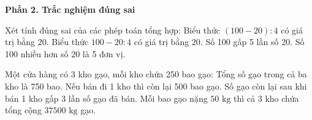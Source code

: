 \textbf{Phần 2. Trắc nghiệm đúng sai}

\begin{ex} %
Xét tính đúng sai của các phép toán tổng hợp:
\choiceTF
{\True Biểu thức $(100 - 20) : 4$ có giá trị bằng $20$.}
{Biểu thức $100 - 20 : 4$ có giá trị bằng $20$.}
{\True Số 100 gấp 5 lần số 20.}
{Số 100 nhiều hơn số 20 là 5 đơn vị.}
\end{ex}

\begin{ex} %
Một cửa hàng có 3 kho gạo, mỗi kho chứa 250 bao gạo:
\choiceTF
{\True Tổng số gạo trong cả ba kho là 750 bao.}
{\True Nếu bán đi 1 kho thì còn lại 500 bao gạo.}
{Số gạo còn lại sau khi bán 1 kho gấp 3 lần số gạo đã bán.}
{\True Mỗi bao gạo nặng $50\text{ kg}$ thì cả 3 kho chứa tổng cộng $37500\text{ kg}$ gạo.}
\end{ex}

